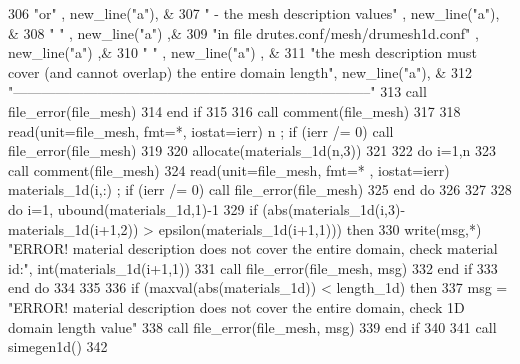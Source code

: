 \begin{DoxyCode}
306 \textcolor{comment}{       }\textcolor{stringliteral}{"or"} , new\_line(\textcolor{stringliteral}{"a"}),  &
307         \textcolor{stringliteral}{"                          - the mesh description values"} ,  new\_line\textcolor{comment}{(}\textcolor{stringliteral}{"a"}\textcolor{comment}{), &}
308 \textcolor{comment}{        }\textcolor{stringliteral}{" "} ,  new\_line(\textcolor{stringliteral}{"a"}) ,&
309         \textcolor{stringliteral}{"in file drutes.conf/mesh/drumesh1d.conf"} ,  new\_line(\textcolor{stringliteral}{"a"}) ,&
310         \textcolor{stringliteral}{" "} , new\_line(\textcolor{stringliteral}{"a"}) , &
311        \textcolor{stringliteral}{"the mesh description must cover (and cannot overlap) the entire domain length"}\textcolor{comment}{,  new\_line(}\textcolor{stringliteral}{"a"}\textcolor{comment}{), &}
312 \textcolor{comment}{        }\textcolor{stringliteral}{"-----------------------------------------------------------------------------"}
313         \textcolor{keyword}{call }file_error(file_mesh)
314 \textcolor{keywordflow}{      end if}
315       
316       \textcolor{keyword}{call }comment(file_mesh)
317 
318       \textcolor{keyword}{read}(unit=file_mesh, fmt=*, iostat=ierr) n ; \textcolor{keywordflow}{if} (ierr /= 0) \textcolor{keyword}{call }
      file_error\textcolor{comment}{(file_mesh)}
319 \textcolor{comment}{}
320 \textcolor{comment}{      }\textcolor{keyword}{allocate}(materials_1d(n,3))
321 
322       \textcolor{keywordflow}{do} i=1,n
323          \textcolor{keyword}{call }comment(file_mesh)
324          \textcolor{keyword}{read}(unit=file_mesh, fmt=* , iostat=ierr)  materials_1d(i,:) ; \textcolor{keywordflow}{if} (ierr\textcolor{comment}{ /= 0) }\textcolor{keyword}{call }
      file_error\textcolor{comment}{(file_mesh)}
325 \textcolor{comment}{}\textcolor{keywordflow}{      end do}
326       
327 
328       \textcolor{keywordflow}{do} i=1, ubound(materials_1d,1)-1
329         \textcolor{keywordflow}{if} (abs(materials_1d(i,3)-materials_1d(i+1,2)) > epsilon(materials_1d\textcolor{comment}{(i+1,1))) }\textcolor{keywordflow}{then}
330           \textcolor{keyword}{write}(msg,*) \textcolor{stringliteral}{"ERROR! material description does not cover the entire domain, check material id:"}\textcolor{comment}{, 
      int(materials_1d(i+1,1))}
331 \textcolor{comment}{          }\textcolor{keyword}{call }file_error(file_mesh, msg)
332 \textcolor{keywordflow}{        end if}
333 \textcolor{keywordflow}{      end do}
334       
335       
336       \textcolor{keywordflow}{if} (maxval(abs(materials_1d)) < length_1d) \textcolor{keywordflow}{then}
337         msg = \textcolor{stringliteral}{"ERROR! material description does not cover the entire domain, check 1D domain length value"}
338         \textcolor{keyword}{call }file_error(file_mesh, msg)
339 \textcolor{keywordflow}{      end if}
340         
341       \textcolor{keyword}{call }simegen1d()
342 
\end{DoxyCode}


